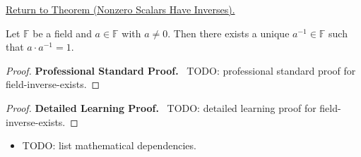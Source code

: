 \newpage
{}
\label{prf:field-inverse-exists}

\begin{remark*}[Return]
\hyperref[prop:field-inverse-exists]{Return to Theorem (Nonzero Scalars Have Inverses).}
\end{remark*}

\begin{theorem*}
Let $\mathbb{F}$ be a field and $a \in \mathbb{F}$ with $a \neq 0$.
Then there exists a unique $a^{-1} \in \mathbb{F}$ such that
$a \cdot a^{-1} = 1$.
\end{theorem*}

\begin{proof}
\textbf{Professional Standard Proof.}~
TODO: professional standard proof for field-inverse-exists.
\end{proof}

\begin{proof}
\textbf{Detailed Learning Proof.}~
TODO: detailed learning proof for field-inverse-exists.
\end{proof}

\begin{remark*}
\end{remark*}

\begin{dependencies}
\begin{itemize}
  \item TODO: list mathematical dependencies.
\end{itemize}
\end{dependencies}

\clearpage
